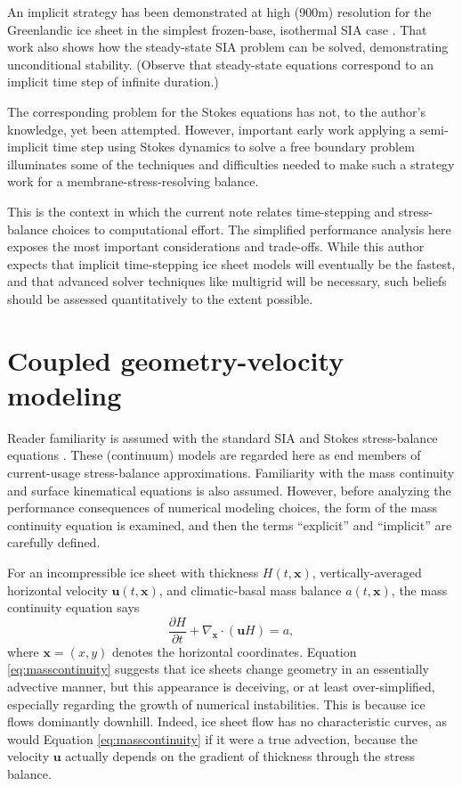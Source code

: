 \documentclass[review,letterpaper]{igs}
\newcommand\bu{\mathbf{u}}
\newcommand\bx{\mathbf{x}}
\newcommand{\Divx}{\nabla_\bx \cdot}
\begin{document}
An implicit strategy has been demonstrated at high (900m) resolution for the Greenlandic ice sheet in the simplest frozen-base, isothermal SIA case \citep{Bueler2016,JouvetGraeser2013}.  That work also shows how the steady-state SIA problem \citep[c.f.][]{JouvetBueler2012} can be solved, demonstrating unconditional stability.  (Observe that steady-state equations correspond to an implicit time step of infinite duration.)

The corresponding problem for the Stokes equations has not, to the author's knowledge, yet been attempted.  However, important early work applying a semi-implicit time step using Stokes dynamics \citep{WirbelJarosch2020} to solve a free boundary problem illuminates some of the techniques and difficulties needed to make such a strategy work for a membrane-stress-resolving balance.

This is the context in which the current note relates time-stepping and stress-balance choices to computational effort.  The simplified performance analysis here exposes the most important considerations and trade-offs.  While this author expects that implicit time-stepping ice sheet models will eventually be the fastest, and that advanced solver techniques like multigrid \citep{Briggsetal2000} will be necessary, such beliefs should be assessed quantitatively to the extent possible.


\section{Coupled geometry-velocity modeling}

Reader familiarity is assumed with the standard SIA and Stokes stress-balance equations \citep{GreveBlatter2009,SchoofHewitt2013}.  These (continuum) models are regarded here as end members of current-usage stress-balance approximations.  Familiarity with the mass continuity and surface kinematical equations \citep{GreveBlatter2009} is also assumed.  However, before analyzing the performance consequences of numerical modeling choices, the form of the mass continuity equation is examined, and then the terms ``explicit'' and ``implicit'' are carefully defined.

For an incompressible ice sheet with thickness $H(t,\bx)$, vertically-averaged horizontal velocity $\bu(t,\bx)$, and climatic-basal mass balance $a(t,\bx)$, the mass continuity equation says
\begin{equation}
\frac{\partial H}{\partial t} + \Divx \left(\bu H\right) = a, \label{eq:masscontinuity}
\end{equation}
where $\bx=(x,y)$ denotes the horizontal coordinates.  Equation \eqref{eq:masscontinuity} suggests that ice sheets change geometry in an essentially advective manner, but this appearance is deceiving, or at least over-simplified, especially regarding the growth of numerical instabilities.  This is because ice flows dominantly downhill.  Indeed, ice sheet flow has no characteristic curves, as would Equation \eqref{eq:masscontinuity} if it were a true advection, because the velocity $\bu$ actually depends on the gradient of thickness through the stress balance.
\end{document}
